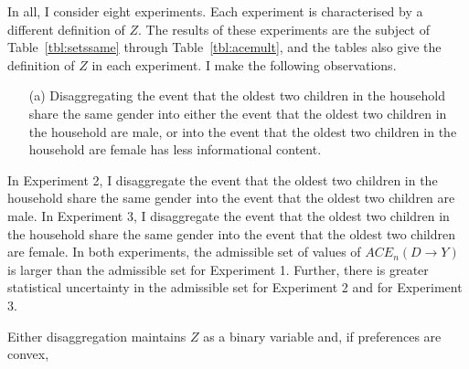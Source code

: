 \documentclass[10pt,a4paper,twoside]{article}
\numberwithin{equation}{section}
\begin{document}
In all, I consider eight experiments. Each experiment is characterised by a different definition of $Z$. The results of these experiments are the subject of Table~\ref{tbl:setssame} through Table~\ref{tbl:acemult}, and the tables also give the definition of $Z$ in each experiment. I make the following observations.
\begin{enumerate}
\item[(a)] Disaggregating the event that the oldest two children in the household share the same gender into either the event that the oldest two children in the household are male, or into the event that the oldest two children in the household are female has less informational content.
\end{enumerate}
In Experiment 2, I disaggregate the event that the oldest two children in the household share the same gender into the event that the oldest two children are male. In Experiment 3, I disaggregate the event that the oldest two children in the household share the same gender into the event that the oldest two children are female. In both experiments, the admissible set of values of $ACE_n(D\rightarrow Y)$ is larger than the admissible set for Experiment 1. Further, there is greater statistical uncertainty in the admissible set for Experiment 2 and for Experiment 3.  

Either disaggregation maintains $Z$ as a binary variable and, if preferences are convex, 
\end{document}

